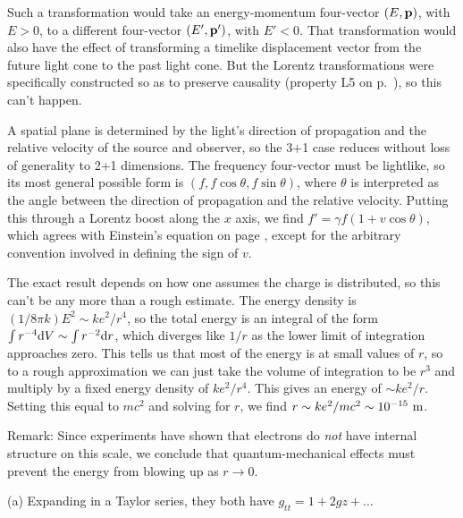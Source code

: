 
Such a transformation would take an energy-momentum four-vector $(E,\mathbf{p})$, with $E>0$, to
a different four-vector $(E',\mathbf{p}')$, with $E'<0$. That transformation would also have the
effect of transforming a timelike displacement vector from the future light cone to the past
light cone. But the Lorentz transformations were specifically constructed so as to preserve
causality (property L5 on p.~\pageref{sec:lorentz-geometry}), so this can't happen.


A spatial plane is determined by the light's direction of propagation and the relative velocity
of the source and observer, so the 3+1 case reduces without loss of generality to 2+1 dimensions.
The frequency four-vector must be lightlike, so its most general possible form is
$(f,f\cos\theta,f\sin\theta)$, where $\theta$ is interpreted as the angle between the direction of
propagation and the relative velocity. Putting this through a Lorentz boost along the $x$ axis,
we find $f'=\gamma f(1+v\cos\theta)$, which agrees with Einstein's equation on page
\pageref{einstein-doppler}, except for the arbitrary convention involved in defining the sign of $v$.


The exact result depends on how one assumes the charge is distributed, so this can't be any more than a rough
estimate. The energy density is $(1/8\pi k)E^2 \sim ke^2/r^4$, so the total energy is an integral of the form
$\int r^{-4} \textup{d} V \sim \int r^{-2} \textup{d} r$, which diverges like $1/r$ as the lower limit of integration approaches
zero. This tells us that most of the energy is at small values of $r$, so to a rough approximation we can just
take the volume of integration to be $r^3$ and multiply by a fixed energy density of $ke^2/r^4$. This gives
an energy of $\sim ke^2/r$. Setting this equal to $mc^2$ and solving for $r$, we find $r \sim ke^2/mc^2 \sim 10^{-15}\ \munit$.

Remark: Since experiments have shown that electrons do \emph{not} have internal structure on this scale, we conclude that
quantum-mechanical effects must prevent the energy from blowing up as $r\rightarrow 0$.



(a) Expanding in a Taylor series, they both have $g_{tt}=1+2gz+\ldots$

